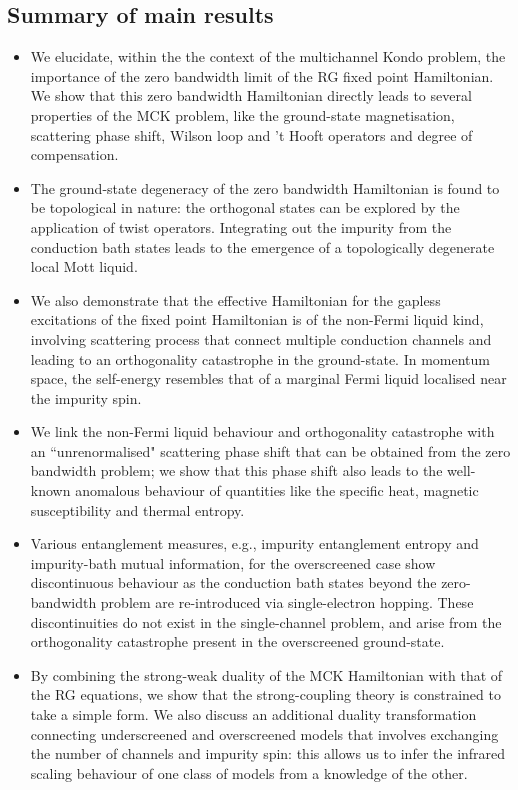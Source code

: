 \documentclass{iopart}
\begin{document}
\subsection*{Summary of main results}
\begin{itemize}
	\item We elucidate, within the the context of the multichannel Kondo problem, the importance of the zero bandwidth limit of the RG fixed point Hamiltonian. We show that this zero bandwidth Hamiltonian directly leads to several properties of the MCK problem, like the ground-state magnetisation, scattering phase shift, Wilson loop and 't Hooft operators and degree of compensation.
	\item The ground-state degeneracy of the zero bandwidth Hamiltonian is found to be topological in nature: the orthogonal states can be explored by the application of twist operators. Integrating out the impurity from the conduction bath states leads to the emergence of a topologically degenerate local Mott liquid.
	\item We also demonstrate that the effective Hamiltonian for the gapless excitations of the fixed point Hamiltonian is of the non-Fermi liquid kind, involving scattering process that connect multiple conduction channels and leading to an orthogonality catastrophe in the ground-state. In momentum space, the self-energy resembles that of a marginal Fermi liquid localised near the impurity spin. 
	\item We link the non-Fermi liquid behaviour and orthogonality catastrophe with an ``unrenormalised" scattering phase shift that can be obtained from the zero bandwidth problem; we show that this phase shift also leads to the well-known anomalous behaviour of quantities like the specific heat, magnetic susceptibility and thermal entropy.
	\item Various entanglement measures, e.g., impurity entanglement entropy and impurity-bath mutual information, for the overscreened case show discontinuous behaviour as the conduction bath states beyond the zero-bandwidth problem are re-introduced via single-electron hopping. These discontinuities do not exist in the single-channel problem, and arise from the orthogonality catastrophe present in the overscreened ground-state.
	\item By combining the strong-weak duality of the MCK Hamiltonian with that of the RG equations, we show that the strong-coupling theory is constrained to take a simple form. We also discuss an additional duality transformation connecting underscreened and overscreened models that involves exchanging the number of channels and impurity spin: this allows us to infer the infrared scaling behaviour of one  class of models from a knowledge of the other.
\end{itemize}
\end{document}
